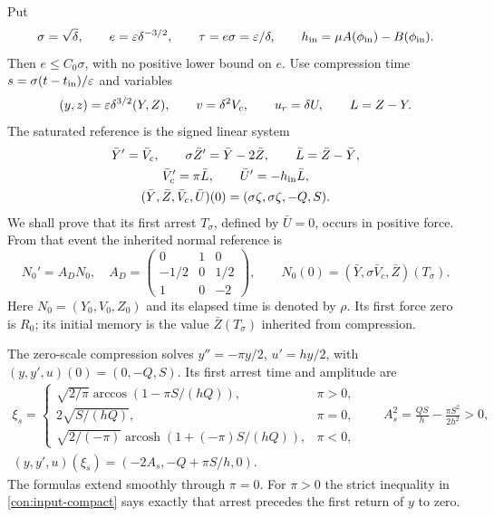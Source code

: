 Put
\begin{equation}
 \sigma=\sqrt\delta,\qquad e=\varepsilon\delta^{-3/2},\qquad
 \tau=e\sigma=\varepsilon/\delta,\qquad
 h_{\rm in}=\mu A(\phi_{\rm in})-B(\phi_{\rm in}).
 \label{con:scales}
\end{equation}
Then $e\le C_0\sigma$, with no positive lower bound on $e$.
Use compression time $s=\sigma(t-t_{\rm in})/\varepsilon$ and variables
\begin{equation}
 (y,z)=\varepsilon\delta^{3/2}(Y,Z),\qquad v=\delta^2V_c,
 \qquad u_r=\delta U,\qquad L=Z-Y.
 \label{con:compression-chart}
\end{equation}
The saturated reference is the signed linear system
\begin{equation}
 \begin{gathered}
 \bar Y'=\bar V_c,\qquad \sigma\bar Z'=\bar Y-2\bar Z,
 \qquad \bar L=\bar Z-\bar Y,\\
 \bar V_c'=\pi\bar L,\qquad \bar U'=-h_{\rm in}\bar L,\\
 (\bar Y,\bar Z,\bar V_c,\bar U)(0)
       =(\sigma\zeta,\sigma\zeta,-Q,S).
 \end{gathered}
 \label{con:reference}
\end{equation}
We shall prove that its first arrest $T_\sigma$, defined by $\bar U=0$,
occurs in positive force.  From that event the inherited normal
reference is
\begin{equation}
 N_0'=A_DN_0,\quad
 A_D=\begin{pmatrix}0&1&0\\-1/2&0&1/2\\1&0&-2\end{pmatrix},
 \qquad N_0(0)=(\bar Y,\sigma\bar V_c,\bar Z)(T_\sigma).
 \label{con:inherited-release}
\end{equation}
Here $N_0=(Y_0,V_0,Z_0)$ and its elapsed time is denoted by $\rho$.
Its first force zero is $R_0$; its initial memory is the value
$\bar Z(T_\sigma)$ inherited from compression.

The zero-scale compression solves $y''=-\pi y/2$, $u'=hy/2$,
with $(y,y',u)(0)=(0,-Q,S)$.  Its first arrest time and amplitude are
\begin{equation}
 \begin{gathered}
 \xi_s=\begin{cases}
 \sqrt{2/\pi}\arccos(1-\pi S/(hQ)),&\pi>0,\\
 2\sqrt{S/(hQ)},&\pi=0,\\
 \sqrt{2/(-\pi)}\operatorname{arcosh}(1+(-\pi)S/(hQ)),&\pi<0,
 \end{cases}
 \qquad
 A_s^2=\frac{QS}{h}-\frac{\pi S^2}{2h^2}>0,\\
 (y,y',u)(\xi_s)=(-2A_s,-Q+\pi S/h,0).
 \end{gathered}
 \label{con:amplitude}
\end{equation}
The formulas extend smoothly through $\pi=0$.  For $\pi>0$ the strict
inequality in \eqref{con:input-compact} says exactly that arrest
precedes the first return of $y$ to zero.

